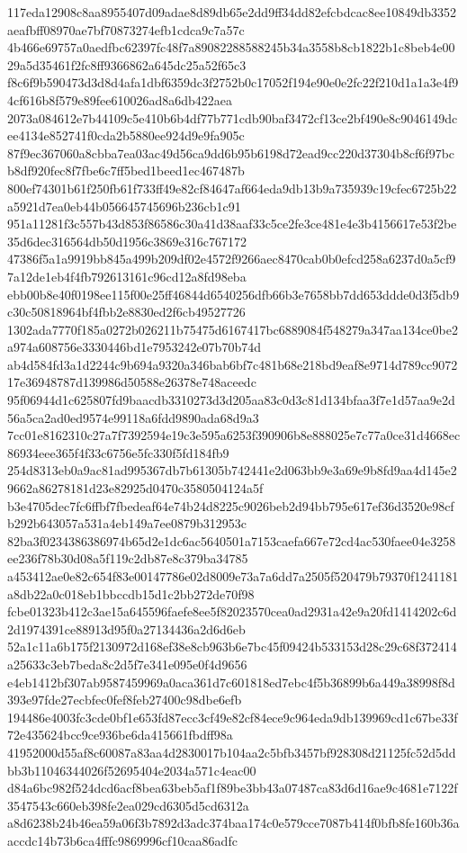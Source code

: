 \documentclass[11pt,a4paper]{article}
\begin{document}
{117eda12908c8aa8955407d09adae8d89db65e2dd9ff34dd82efcbdcac8ee10849db3352aeafbff08970ae7bf70873274efb1cdca9c7a57c
4b466e69757a0aedfbc62397fc48f7a89082288588245b34a3558b8cb1822b1c8beb4e0029a5d35461f2fc8ff9366862a645dc25a52f65c3
f8c6f9b590473d3d8d4afa1dbf6359dc3f2752b0c17052f194e90e0e2fc22f210d1a1a3e4f94cf616b8f579e89fee610026ad8a6db422aea
2073a084612e7b44109c5e410b6b4df77b771cdb90baf3472cf13ce2bf490e8c9046149dcee4134e852741f0cda2b5880ee924d9e9fa905c
87f9ec367060a8cbba7ea03ac49d56ca9dd6b95b6198d72ead9cc220d37304b8cf6f97bcb8df920fec8f7fbe6c7ff5bed1beed1ec467487b
800ef74301b61f250fb61f733ff49e82cf84647af664eda9db13b9a735939c19cfec6725b22a5921d7ea0eb44b056645745696b236cb1c91
951a11281f3c557b43d853f86586c30a41d38aaf33c5ce2fe3ce481e4e3b4156617e53f2be35d6dec316564db50d1956c3869e316c767172
47386f5a1a9919bb845a499b209df02e4572f9266aec8470cab0b0efcd258a6237d0a5cf97a12de1eb4f4fb792613161c96cd12a8fd98eba
ebb00b8e40f0198ee115f00e25ff46844d6540256dfb66b3e7658bb7dd653ddde0d3f5db9c30c50818964bf4fbb2e8830ed2f6cb49527726
1302ada7770f185a0272b026211b75475d6167417bc6889084f548279a347aa134ce0be2a974a608756e3330446bd1e7953242e07b70b74d
ab4d584fd3a1d2244c9b694a9320a346bab6bf7c481b68e218bd9eaf8e9714d789cc907217e36948787d139986d50588e26378e748aceedc
95f06944d1c625807fd9baacdb3310273d3d205aa83c0d3c81d134bfaa3f7e1d57aa9e2d56a5ca2ad0ed9574e99118a6fdd9890ada68d9a3
7cc01e8162310c27a7f7392594e19c3e595a6253f390906b8e888025e7c77a0ce31d4668ec86934eee365f4f33c6756e5fc330f5fd184fb9
254d8313eb0a9ac81ad995367db7b61305b742441e2d063bb9e3a69e9b8fd9aa4d145e29662a86278181d23e82925d0470c3580504124a5f
b3e4705dec7fc6ffbf7fbedeaf64e74b24d8225c9026beb2d94bb795e617ef36d3520e98cfb292b643057a531a4eb149a7ee0879b312953c
82ba3f0234386386974b65d2e1dc6ac5640501a7153caefa667e72cd4ac530faee04e3258ee236f78b30d08a5f119c2db87e8c379ba34785
a453412ae0e82c654f83e00147786e02d8009e73a7a6dd7a2505f520479b79370f1241181a8db22a0c018eb1bbccdb15d1c2bb272de70f98
fcbe01323b412c3ae15a645596faefe8ee5f82023570cea0ad2931a42e9a20fd1414202c6d2d1974391ce88913d95f0a27134436a2d6d6eb
52a1c11a6b175f2130972d168ef38e8cb963b6e7bc45f09424b533153d28c29c68f372414a25633c3eb7beda8c2d5f7e341e095e0f4d9656
e4eb1412bf307ab9587459969a0aca361d7c601818ed7ebc4f5b36899b6a449a38998f8d393e97fde27ecbfec0fef8feb27400c98dbe6efb
194486e4003fc3cde0bf1e653fd87ecc3cf49e82cf84ece9c964eda9db139969cd1c67be33f72e435624bcc9ce936be6da415661fbdff98a
41952000d55af8c60087a83aa4d2830017b104aa2c5bfb3457bf928308d21125fc52d5ddbb3b11046344026f52695404e2034a571c4eac00
d84a6bc982f524dcd6acf8bea63beb5af1f89be3bb43a07487ca83d6d16ae9c4681e7122f3547543c660eb398fe2ea029cd6305d5cd6312a
a8d6238b24b46ea59a06f3b7892d3adc374baa174c0e579cce7087b414f0bfb8fe160b36aaccdc14b73b6ca4fffc9869996cf10caa86adfc
}
\end{document}
